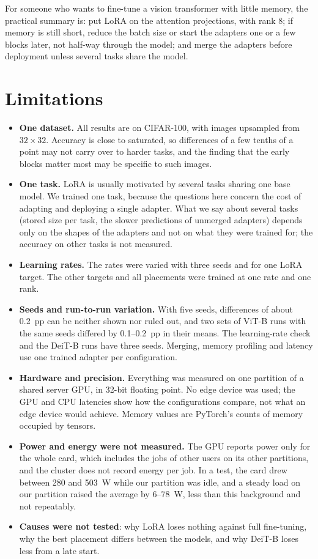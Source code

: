 For someone who wants to fine-tune a vision transformer with little memory, the practical summary is: put LoRA on
the attention projections, with rank 8; if memory is still short, reduce the batch size or start the adapters one or a few blocks later, not half-way through the
model; and merge the adapters before deployment unless several tasks
share the model.

\section{Limitations}
\label{sec:limitations}

\begin{itemize}
  \item \textbf{One dataset.} All results are on CIFAR-100, with images upsampled from $32\times32$. Accuracy is
        close to saturated, so differences of a few tenths of a point may not carry over to harder tasks, and the
        finding that the early blocks matter most may be specific to such images.
  \item \textbf{One task.} LoRA is usually motivated by several tasks sharing one base model. We trained one
        task, because the questions here concern the cost of adapting and deploying a single adapter. What we say
        about several tasks (stored size per task, the slower predictions of unmerged adapters) depends only on the
        shapes of the adapters and not on what they were trained for; the accuracy on other tasks is not measured.
  \item \textbf{Learning rates.} The rates were varied with three seeds and for one LoRA target. The other targets
        and all placements were trained at one rate and one rank.
  \item \textbf{Seeds and run-to-run variation.} With five seeds, differences of about 0.2~pp can be neither shown
        nor ruled out, and two sets of ViT-B runs with the same seeds differed by 0.1--0.2~pp in their means. The
        learning-rate check and the DeiT-B runs have three seeds. Merging, memory profiling and latency use one
        trained adapter per configuration.
  \item \textbf{Hardware and precision.} Everything was measured on one partition of a shared server GPU, in 32-bit
        floating point. No edge device was used; the GPU and CPU latencies show how the configurations compare, not
        what an edge device would achieve. Memory values are PyTorch's counts of memory occupied by tensors.
  \item \textbf{Power and energy were not measured.} The GPU reports power only for the whole card, which includes
        the jobs of other users on its other partitions, and the cluster does not record energy per job. In a test,
        the card drew between 280 and 503~W while our partition was idle, and a steady load on our partition raised
        the average by 6--78~W, less than this background and not repeatably.
  \item \textbf{Causes were not tested}: why LoRA loses nothing against full fine-tuning, why the best placement
        differs between the models, and why DeiT-B loses less from a late start.
\end{itemize}

